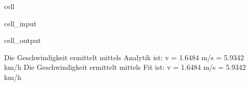 \documentclass[letterpaper,10pt,english]{jupyterBook}
\begin{document}
\begin{sphinxuseclass}{cell}\begin{sphinxVerbatimInput}

\begin{sphinxuseclass}{cell_input}
\begin{sphinxVerbatim}[commandchars=\\\{\}]
  
\PYG{p}{[}\PYG{p}{]}\PYG{p}{[}\PYG{p}{]}
  
  
\end{sphinxVerbatim}

\end{sphinxuseclass}\end{sphinxVerbatimInput}
\begin{sphinxVerbatimOutput}

\begin{sphinxuseclass}{cell_output}
\begin{sphinxVerbatim}[commandchars=\\\{\}]
Die Geschwindigkeit ermittelt mittels Analytik ist: v = 1.6484 m/s = 5.9342 km/h
Die Geschwindigkeit ermittelt mittels Fit ist:      v = 1.6484 m/s = 5.9342 km/h
\end{sphinxVerbatim}

\end{sphinxuseclass}\end{sphinxVerbatimOutput}

\end{sphinxuseclass}
\end{document}
